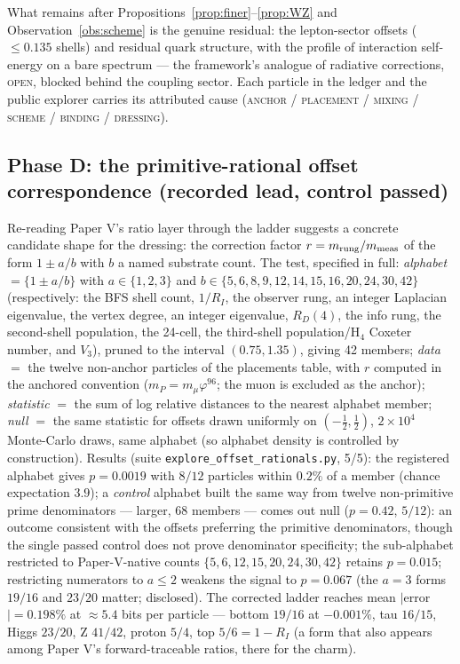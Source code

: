 \documentclass[12pt]{article}
\theoremstyle{definition}
\theoremstyle{remark}
\begin{document}
What remains after Propositions~\ref{prop:finer}--\ref{prop:WZ} and Observation~\ref{obs:scheme} is the genuine residual: the lepton-sector offsets ($\le 0.135$ shells) and residual quark structure, with the profile of interaction self-energy on a bare spectrum --- the framework's analogue of radiative corrections, \textsc{open}, blocked behind the coupling sector. Each particle in the ledger and the public explorer carries its attributed cause (\textsc{anchor} / \textsc{placement} / \textsc{mixing} / \textsc{scheme} / \textsc{binding} / \textsc{dressing}).

\subsection*{Phase D: the primitive-rational offset correspondence (recorded lead, control passed)}

Re-reading Paper V's ratio layer through the ladder suggests a concrete candidate shape for the dressing: the correction factor $r = m_{\rm rung}/m_{\rm meas}$ of the form $1 \pm a/b$ with $b$ a named substrate count. The test, specified in full: \emph{alphabet} $= \{1 \pm a/b\}$ with $a \in \{1,2,3\}$ and $b \in \{5, 6, 8, 9, 12, 14, 15, 16, 20, 24, 30, 42\}$ (respectively: the BFS shell count, $1/R_I$, the observer rung, an integer Laplacian eigenvalue, the vertex degree, an integer eigenvalue, $R_D(4)$, the info rung, the second-shell population, the 24-cell, the third-shell population/H$_4$ Coxeter number, and $V_3$), pruned to the interval $(0.75, 1.35)$, giving 42 members; \emph{data} $=$ the twelve non-anchor particles of the placements table, with $r$ computed in the anchored convention ($m_P = m_\mu\varphi^{96}$; the muon is excluded as the anchor); \emph{statistic} $=$ the sum of log relative distances to the nearest alphabet member; \emph{null} $=$ the same statistic for offsets drawn uniformly on $(-\tfrac12, \tfrac12)$, $2\times10^4$ Monte-Carlo draws, same alphabet (so alphabet density is controlled by construction). Results (suite \texttt{explore\_offset\_rationals.py}, 5/5): the registered alphabet gives $p = 0.0019$ with $8/12$ particles within $0.2\%$ of a member (chance expectation $3.9$); a \emph{control} alphabet built the same way from twelve non-primitive prime denominators --- larger, 68 members --- comes out null ($p = 0.42$, $5/12$): an outcome consistent with the offsets preferring the primitive denominators, though the single passed control does not prove denominator specificity; the sub-alphabet restricted to Paper-V-native counts $\{5,6,12,15,20,24,30,42\}$ retains $p = 0.015$; restricting numerators to $a \le 2$ weakens the signal to $p = 0.067$ (the $a = 3$ forms $19/16$ and $23/20$ matter; disclosed). The corrected ladder reaches mean $|$error$| = 0.198\%$ at $\approx 5.4$ bits per particle --- bottom $19/16$ at $-0.001\%$, tau $16/15$, Higgs $23/20$, Z $41/42$, proton $5/4$, top $5/6 = 1 - R_I$ (a form that also appears among Paper V's forward-traceable ratios, there for the charm).
\end{document}
